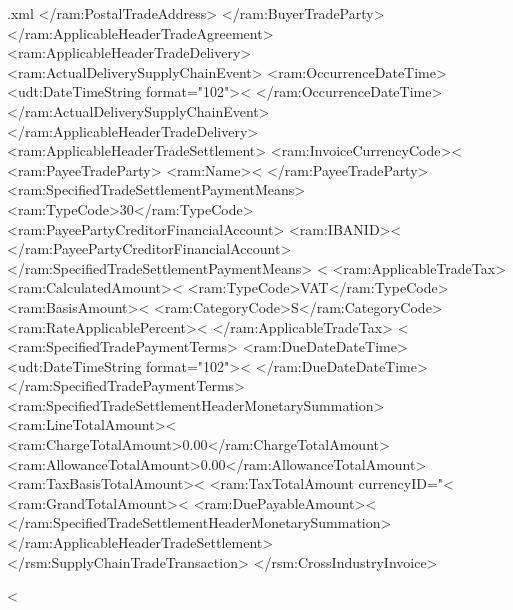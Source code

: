 \begin{filecontents*}{\jobname.xml}
        </ram:PostalTradeAddress>
      </ram:BuyerTradeParty>
    </ram:ApplicableHeaderTradeAgreement>
    <ram:ApplicableHeaderTradeDelivery>
      <ram:ActualDeliverySupplyChainEvent>
        <ram:OccurrenceDateTime>
          <udt:DateTimeString format="102"><%
        </ram:OccurrenceDateTime>
      </ram:ActualDeliverySupplyChainEvent>
    </ram:ApplicableHeaderTradeDelivery>
    <ram:ApplicableHeaderTradeSettlement>
      <ram:InvoiceCurrencyCode><%
      <ram:PayeeTradeParty>
            <ram:Name><%
      </ram:PayeeTradeParty>
      <ram:SpecifiedTradeSettlementPaymentMeans>
      <ram:TypeCode>30</ram:TypeCode>
       <ram:PayeePartyCreditorFinancialAccount>
        <ram:IBANID><%
       </ram:PayeePartyCreditorFinancialAccount>
      </ram:SpecifiedTradeSettlementPaymentMeans>
      <%
      <ram:ApplicableTradeTax>
        <ram:CalculatedAmount><%
        <ram:TypeCode>VAT</ram:TypeCode>
        <ram:BasisAmount><%
		<ram:CategoryCode>S</ram:CategoryCode>
        <ram:RateApplicablePercent><%
      </ram:ApplicableTradeTax>
      <%
	  <ram:SpecifiedTradePaymentTerms>
        <ram:DueDateDateTime>
          <udt:DateTimeString format="102"><%
        </ram:DueDateDateTime>
      </ram:SpecifiedTradePaymentTerms>
      <ram:SpecifiedTradeSettlementHeaderMonetarySummation>
        <ram:LineTotalAmount><%
        <ram:ChargeTotalAmount>0.00</ram:ChargeTotalAmount>
        <ram:AllowanceTotalAmount>0.00</ram:AllowanceTotalAmount>
        <ram:TaxBasisTotalAmount><%
		<ram:TaxTotalAmount currencyID="<%
        <ram:GrandTotalAmount><%
		<ram:DuePayableAmount><%
      </ram:SpecifiedTradeSettlementHeaderMonetarySummation>
    </ram:ApplicableHeaderTradeSettlement>
  </rsm:SupplyChainTradeTransaction>
</rsm:CrossIndustryInvoice>
\end{filecontents*}



<%
